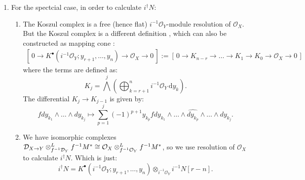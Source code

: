 \begin{remark}
\begin{enumerate}
        \item For the spectcial case, in order to calculate $i^\dagger N$:
              \begin{enumerate}
                  \item \cite[Equation~1.5.1.]{hotta2008d} The Koszul complex is a free (hence flat) $i^{-1}\mathcal{O}_Y$-module resolution of $\mathcal{O}_X$.
                        But the Koszul complex is a different definition \cite[\href{https://stacks.math.columbia.edu/tag/0623}{Tag 0623}]{stacks-project}, which can also be constructed as mapping cone \cite[\href{https://stacks.math.columbia.edu/tag/0629}{Tag 0629}]{stacks-project}:
                        \begin{align*}
                            \left[\, 0 \to K^\bullet(i^{-1}\mathcal{O}_Y; y_{r+1}, \dots, y_{n}) \to \mathcal{O}_X \to 0\, \right] := \left[\, 0 \to K_{n-r} \to \dots \to K_1 \to K_0 \to \mathcal{O}_X \to 0\, \right]
                        \end{align*}
                        where the terms are defined as:
                        $$
                            K_j = \bigwedge^j \left( \bigoplus_{k=r+1}^n i^{-1}\mathcal{O}_Y\, \mathrm{d}y_k \right).
                        $$
                        The differential $K_j \to K_{j-1}$ is given by:
                        $$
                            f dy_{k_1} \wedge \dots \wedge dy_{k_j} \longmapsto \sum_{p=1}^j (-1)^{p+1} y_{k_p} f dy_{k_1} \wedge \dots \wedge \widehat{dy_{k_p}} \wedge \dots \wedge dy_{k_j}.
                        $$
                  \item \cite[Prop.~1.5.8.]{hotta2008d} We have isomorphic complexes $\mathcal{D}_{X \to Y} \otimes_{f^{-1}\mathcal{D}_Y}^L f^{-1}M^* \cong \mathcal{O}_X \otimes_{f^{-1}\mathcal{O}_Y}^L f^{-1}M^*$, so we use resolution of $\mathcal{O}_X$ to calculate $i^\dagger N$. Which is just:
                        $$i^\dagger N = K^\bullet(i^{-1}\mathcal{O}_Y; y_{r+1}, \dots, y_{n}) \otimes_{i^{-1}\mathcal{O}_Y} i^{-1}N [r-n].$$
              \end{enumerate}
    \end{enumerate}

\end{remark}

